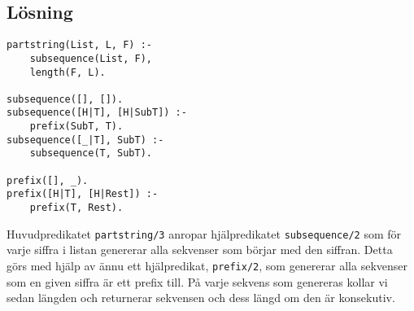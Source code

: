 \documentclass[12pt]{article}
\begin{document}
\subsection*{Lösning}

\begin{verbatim}
partstring(List, L, F) :-
    subsequence(List, F),
    length(F, L).

subsequence([], []).
subsequence([H|T], [H|SubT]) :-
    prefix(SubT, T).
subsequence([_|T], SubT) :-
    subsequence(T, SubT).

prefix([], _).
prefix([H|T], [H|Rest]) :-
    prefix(T, Rest).
\end{verbatim}

Huvudpredikatet \texttt{partstring/3} anropar hjälpredikatet \texttt{subsequence/2} som för varje siffra i listan genererar alla sekvenser som börjar med den siffran. Detta görs med hjälp av ännu ett hjälpredikat, \texttt{prefix/2}, som genererar alla sekvenser som en given siffra är ett prefix till. På varje sekvens som genereras kollar vi sedan längden och returnerar sekvensen och dess längd om den är konsekutiv.
\end{document}
